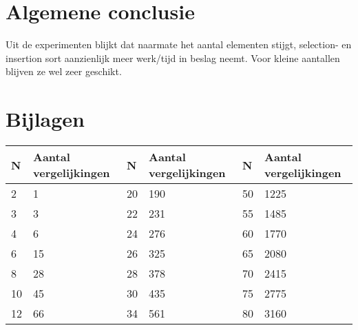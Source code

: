 \documentclass[11pt, a4paper]{article}
\begin{document}
\section*{Algemene conclusie}
Uit de experimenten blijkt dat naarmate het aantal elementen stijgt, selection- en insertion sort aanzienlijk meer werk/tijd in beslag neemt. Voor kleine aantallen blijven ze wel zeer geschikt.


\newpage
\section*{Bijlagen}
\begin{table}[H]
\centering
\begin{tabular}{|ll|ll|ll|}
\hline
\multicolumn{1}{|l|}{\textbf{N}} & \textbf{Aantal vergelijkingen} & \multicolumn{1}{l|}{\textbf{N}} & \textbf{Aantal vergelijkingen} & \multicolumn{1}{l|}{\textbf{N}} & \textbf{Aantal vergelijkingen} \\ \hline
2                                & 1                              & 20                              & 190                            & 50                              & 1225                           \\
3                                & 3                              & 22                              & 231                            & 55                              & 1485                           \\
4                                & 6                              & 24                              & 276                            & 60                              & 1770                           \\
6                                & 15                             & 26                              & 325                            & 65                              & 2080                           \\
8                                & 28                             & 28                              & 378                            & 70                              & 2415                           \\
10                               & 45                             & 30                              & 435                            & 75                              & 2775                           \\
12                               & 66                             & 34                              & 561                            & 80                              & 3160                           \\

\end{tabular}
\end{table}
\end{document}
